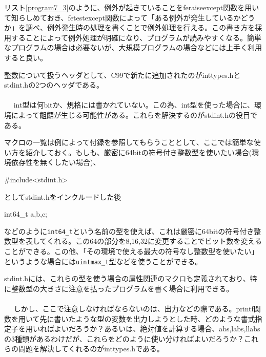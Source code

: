 リスト\ref{program7_3}のように、例外が起きていることをferaiseexcept関数を用いて知らしめておき、fetestexcept関数によって「ある例外が発生しているかどうか」を調べ、例外発生時の処理を書くことで例外処理を行える。この書き方を採用することによって例外処理が明確になり、プログラムが読みやすくなる。簡単なプログラムの場合は必要ないが、大規模プログラムの場合などには上手く利用すると良い。

整数について扱うヘッダとして、C99で新たに追加されたのがinttypes.hとstdint.hの2つのヘッダである。
\\ \\　
int型は何bitか、規格には書かれていない。この為、int型を使った場合に、環境によって齟齬が生じる可能性がある。これらを解決するのがstdint.hの役目である。

マクロの一覧は例によって付録を参照してもらうこととして、ここでは簡単な使い方を紹介しておく。もしも、厳密に64bitの符号付き整数型を使いたい場合(環境依存性を無くしたい場合)、
\begin{code}
#include<stdint.h>
\end{code}
としてstdint.hをインクルードした後
\begin{code}
int64_t a,b,c;
\end{code}
などのように\verb|int64_t|という名前の型を使えば、これは厳密に64bitの符号付き整数型を表してくれる。この64の部分を8,16,32に変更することでビット数を変えることができる。この他、「その環境で使える最大の符号なし整数型を使いたい」というような場合には\verb|uintmax_t|型などを使うことができる。

stdint.hには、これらの型を使う場合の属性関連のマクロも定義されており、特に整数型の大きさに注意を払ったプログラムを書く場合に利用できる。
\\ \\　
しかし、ここで注意しなければならないのは、出力などの際である。printf関数を用いて先に書いたような型の変数を出力しようとした時、どのような書式指定子を用いればよいだろうか？あるいは、絶対値を計算する場合、abs,labs,llabsの3種類があるわけだが、これらをどのように使い分ければよいだろうか？これらの問題を解決してくれるのがinttypes.hである。

